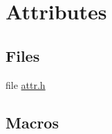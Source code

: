 \hypertarget{group__ClassicAttributes}{}\section{Attributes}
\label{group__ClassicAttributes}
\subsection*{Files}
\begin{DoxyCompactItemize}
\item 
file \mbox{\hyperlink{attr_8h}{attr.\+h}}
\end{DoxyCompactItemize}
\subsection*{Macros}
